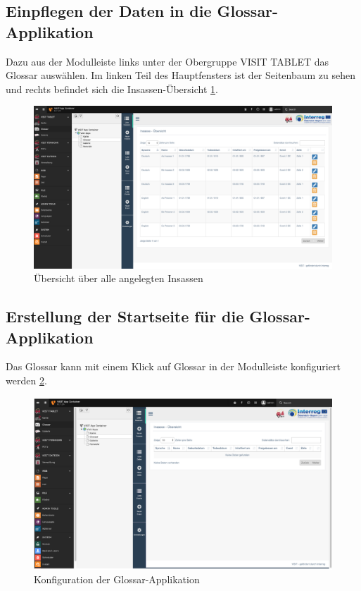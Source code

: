 \subsection{Einpflegen der Daten in die Glossar-Applikation}

Dazu aus der Modulleiste links unter der Obergruppe VISIT TABLET das Glossar auswählen. Im linken Teil des Hauptfensters ist der Seitenbaum zu sehen und rechts befindet sich die Insassen-Übersicht \ref{img:uebersicht_glossar}.

\begin{figure}[ht!]
\centering
\includegraphics[width=12cm]{Figures/paula/glossar/uebersicht_insassen.png}
\caption{Übersicht über alle angelegten Insassen}
\label{img:uebersicht_glossar}
\end{figure}


\subsection{Erstellung der Startseite für die Glossar-Applikation}
Das Glossar kann mit einem Klick auf Glossar in der Modulleiste konfiguriert werden \ref{img:konfiguration_glossar}.

\begin{figure}[ht!]
\centering
\includegraphics[width=12cm]{Figures/paula/glossar/konfiguration_glossar.png}
\caption{Konfiguration der Glossar-Applikation}
\label{img:konfiguration_glossar}
\end{figure}

